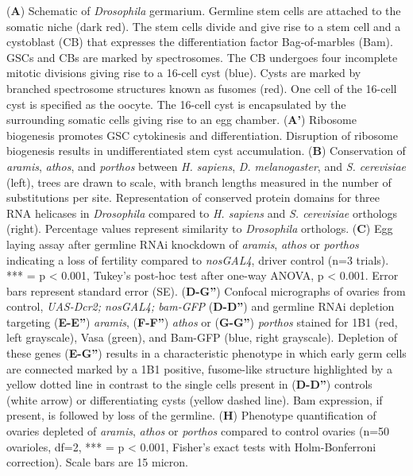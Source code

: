 \documentclass[12pt,oneside]{reedthesis}
\begin{document}
(\textbf{A}) Schematic of \emph{Drosophila} germarium.
Germline stem cells are attached to the somatic niche (dark red). The
stem cells divide and give rise to a stem cell and a cystoblast (CB)
that expresses the differentiation factor Bag-of-marbles (Bam). GSCs and
CBs are marked by spectrosomes. The CB undergoes four incomplete mitotic
divisions giving rise to a 16-cell cyst (blue). Cysts are marked by
branched spectrosome structures known as fusomes (red). One cell of the
16-cell cyst is specified as the oocyte. The 16-cell cyst is
encapsulated by the surrounding somatic cells giving rise to an egg
chamber. (\textbf{A'}) Ribosome biogenesis promotes GSC cytokinesis and
differentiation. Disruption of ribosome biogenesis results in
undifferentiated stem cyst accumulation. (\textbf{B}) Conservation of
\emph{aramis}, \emph{athos}, and \emph{porthos} between \emph{H. sapiens}, \emph{D.
melanogaster}, and \emph{S. cerevisiae} (left), trees are drawn to scale,
with branch lengths measured in the number of substitutions per site.
Representation of conserved protein domains for three RNA helicases in
\emph{Drosophila} compared to \emph{H. sapiens} and \emph{S. cerevisiae} orthologs
(right). Percentage values represent similarity to \emph{Drosophila}
orthologs. (\textbf{C}) Egg laying assay after germline RNAi knockdown of
\emph{aramis}, \emph{athos} or \emph{porthos} indicating a loss of fertility compared
to \emph{nosGAL4}, driver control (n=3 trials). *** = p \textless{} 0.001, Tukey's
post-hoc test after one-way ANOVA, p \textless{} 0.001. Error bars represent
standard error (SE). (\textbf{D-G''}) Confocal micrographs of ovaries from
control, \emph{UAS-Dcr2; nosGAL4; bam-GFP} (\textbf{D-D''}) and germline RNAi
depletion targeting (\textbf{E-E''}) \emph{aramis}, (\textbf{F-F''}) \emph{athos} or
(\textbf{G-G''}) \emph{porthos} stained for 1B1 (red, left grayscale), Vasa
(green), and Bam-GFP (blue, right grayscale). Depletion of these genes
(\textbf{E-G''}) results in a characteristic phenotype in which early germ
cells are connected marked by a 1B1 positive, fusome-like structure
highlighted by a yellow dotted line in contrast to the single cells
present in (\textbf{D-D''}) controls (white arrow) or differentiating cysts
(yellow dashed line). Bam expression, if present, is followed by loss of
the germline. (\textbf{H}) Phenotype quantification of ovaries depleted of
\emph{aramis}, \emph{athos} or \emph{porthos} compared to control ovaries (n=50
ovarioles, df=2, *** = p \textless{} 0.001, Fisher's exact tests with
Holm-Bonferroni correction). Scale bars are 15 micron.
\end{document}
